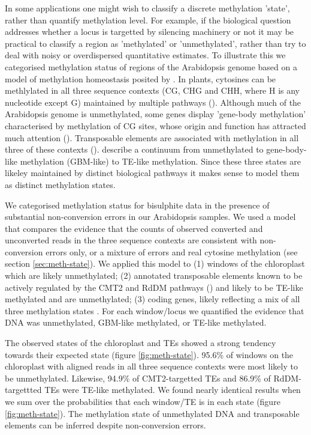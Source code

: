 \documentclass[12pt,longbibliography]{article}
\begin{document}
In some applications one might wish to classify a discrete methylation 'state', rather than quantify methylation level.
For example, if the biological question addresses whether a locus is targetted by silencing machinery or not it may be practical to classify a region as 'methylated' or 'unmethylated', rather than try to deal with noisy or overdispersed quantitative estimates.
To illustrate this we categorised methylation status of regions of the Arabidopsis genome based on a model of methylation homeostasis posited by \textcite{zhang2020natural}.
In plants, cytosines can be methlylated in all three sequence contexts (CG, CHG and CHH, where H is any nucleotide except G) maintained by multiple pathways (\cite{law2010establishing}).
Although much of the Arabidopsis genome is unmethylated, some genes display 'gene-body methylation' characterised by methylation of CG sites, whose origin and function has attracted much attention (\cite{muyle2022gene}). 
Transposable elements are associated with methylation in all three of these contexts (\cite{cokus2008shotgun, lister2008highly}).
\textcite{zhang2020natural} describe a continuum from unmethylated to gene-body-like methylation (GBM-like) to TE-like methylation.
Since these three states are likeley maintained by distinct biological pathways it makes sense to model them as distinct methylation states.

We categorised methylation status for bisulphite data in the presence of substantial non-conversion errors in our Arabidopsis samples.
We used a model that compares the evidence that the counts of observed converted and unconverted reads in the three sequence contexts are consistent with non-conversion errors only, or a mixture of errors and real cytosine methylation (see section \ref{sec:meth-state}).
We applied this model to (1) windows of the chloroplast which are likely unmethylated; (2) annotated transposable elements known to be actively regulated by the CMT2 and RdDM pathways (\cite{stroud2013comprehensive}) and likely to be TE-like methylated and are unmethylated; (3) coding genes, likely reflecting a mix of all three methylation states \parencite{zhang2020natural}.
For each window/locus we quantified the evidence that DNA was unmethylated, GBM-like methylated, or TE-like methylated.

The observed states of the chloroplast and TEs showed a strong tendency towards their expected state (figure \ref{fig:meth-state}).
95.6\% of windows on the chloroplast with aligned reads in all three sequence contexts were most likely to be unmethylated.
Likewise, 94.9\% of CMT2-targetted TEs and 86.9\% of RdDM-targettted TEs were TE-like methylated.
We found nearly identical results when we sum over the probabilities that each window/TE is in each state (figure \ref{fig:meth-state}).
The methylation state of unmethylated DNA and transposable elements can be inferred despite non-conversion errors.
\end{document}
